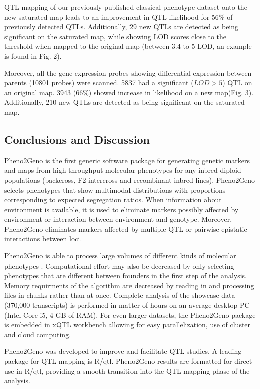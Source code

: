 QTL mapping of our previously published classical phenotype dataset \cite{Joosen:2011} onto the 
new saturated map leads to an improvement in QTL likelihood for 56\% of previously detected QTLs. 
Additionally, 29 new QTLs are detected as being significant on the saturated map, while showing 
LOD scores close to the threshold when mapped to the original map (between 3.4 to 5 LOD, an 
example is found in Fig. 2).

Moreover, all the gene expression probes showing differential expression between parents (10801 
probes) were scanned. 5837 had a significant ($LOD > 5$) QTL on an original map. 3943 (66\%) 
showed increase in likelihood on a new map(Fig. 3). Additionally, 210 new QTLs are detected as 
being significant on the saturated map.
  
\subsection{Conclusions and Discussion}
Pheno2Geno is the first generic software package for generating genetic markers and maps from 
high-throughput molecular phenotypes for any inbred diploid populations (backcross, F2 intercross 
and recombinant inbred lines). Pheno2Geno selects phenotypes that show multimodal distributions 
with proportions corresponding to expected segregation ratios. When information about environment 
is available, it is used to eliminate markers possibly affected by environment or interaction 
between environment and genotype. Moreover, Pheno2Geno eliminates markers affected by multiple 
QTL or pairwise epistatic interactions between loci.

Pheno2Geno is able to process large volumes of different kinds of molecular phenotypes 
\cite{Trelles:2011}. Computational effort may also be decreased by only selecting phenotypes 
that are different between founders in the first step of the analysis. Memory requirments of the 
algorithm are decreased by reading in and processing files in chunks rather than at once. 
Complete analysis of the showcase data (370,000 transcripts) is performed in matter of hours 
on an average desktop PC (Intel Core i5, 4 GB of RAM). For even larger datasets, the Pheno2Geno 
package is embedded in xQTL workbench \cite{Arends:2012a, Snoek:2012} allowing for easy 
parallelization, use of cluster and cloud computing.\newline

Pheno2Geno was developed to improve and facilitate QTL studies. A leading package for QTL mapping 
is R/qtl. Pheno2Geno results are formatted for direct use in R/qtl, providing a smooth transition 
into the QTL mapping phase of the analysis. \newline


